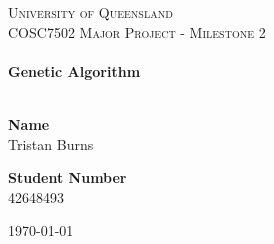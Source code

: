 \begin{titlepage}
\begin{center}

\textsc{\LARGE University of Queensland}\\[1.5cm]
\textsc{\Large COSC7502 Major Project - Milestone 2}\\[0.5cm]

\HRule \\[0.4cm]
{\huge \bfseries Genetic Algorithm\\[0.4cm]}
\HRule \\[1.5cm]

\begin{minipage}{0.4\textwidth}
\begin{flushleft} \large
\textbf{Name}\\
Tristan Burns
\end{flushleft}
\end{minipage}
\begin{minipage}{0.4\textwidth}
\begin{flushright} \large
\textbf{Student Number} \\
42648493
\end{flushright}
\end{minipage}



\vfill

{\large \today}

\end{center}

\end{titlepage}
